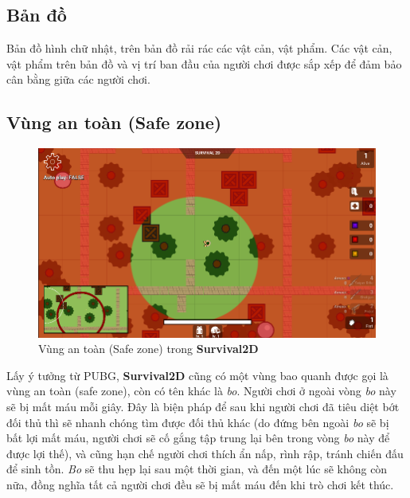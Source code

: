 \documentclass[12pt,a4paper]{article}
\begin{document}
  \subsection{Bản đồ}
  Bản đồ hình chữ nhật, trên bản đồ rải rác các vật cản, vật phẩm. Các vật cản, vật phẩm trên bản đồ và vị trí ban đầu của người chơi được sắp xếp để đảm bảo cân bằng giữa các người chơi.

  \subsection{Vùng an toàn (Safe zone)}\label{safezone}\mbox{}

  \begin{figure}[H]
      \centering
      \includegraphics[width=1\textwidth]{Img/game_screen_shoot/safe_zone.png}
      \caption{Vùng an toàn (Safe zone) trong \textbf{Survival2D}}
  \end{figure}
  
  Lấy ý tưởng từ PUBG, \textbf{Survival2D} cũng có một vùng bao quanh được gọi là vùng an toàn (safe zone), còn có tên khác là \textit{bo}. Người chơi ở ngoài vòng \textit{bo} này sẽ bị mất máu mỗi giây. Đây là biện pháp để sau khi người chơi đã tiêu diệt bớt đối thủ thì sẽ nhanh chóng tìm được đối thủ khác (do đứng bên ngoài \textit{bo} sẽ bị bất lợi mất máu, người chơi sẽ cố gắng tập trung lại bên trong vòng \textit{bo} này để được lợi thế), và cũng hạn chế người chơi thích ẩn nấp, rình rập, tránh chiến đấu để sinh tồn. \textit{Bo} sẽ thu hẹp lại sau một thời gian, và đến một lúc sẽ không còn nữa, đồng nghĩa tất cả người chơi đều sẽ bị mất máu đến khi trò chơi kết thúc.
\end{document}
